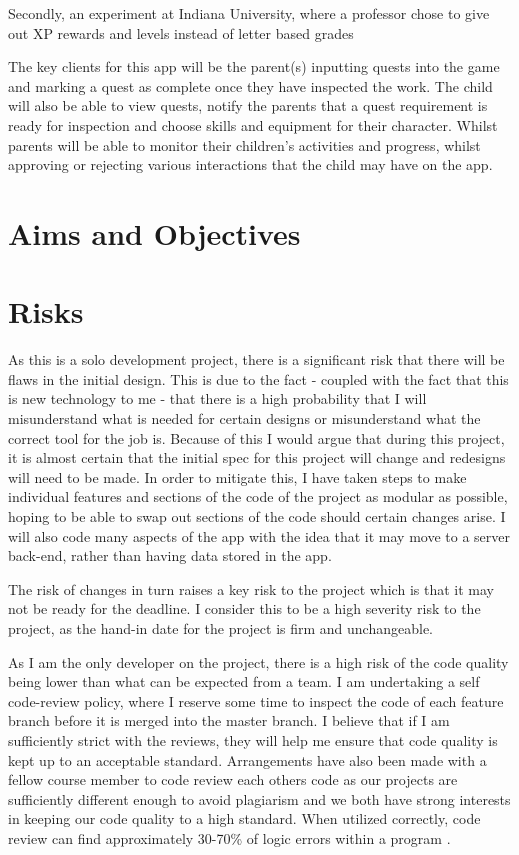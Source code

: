 Secondly, an experiment at Indiana University, where a professor chose to give out XP rewards and levels instead of letter based grades \cite{sheldon2011multiplayer} 

The key clients for this app will be the parent(s) inputting quests into the game and marking a quest as complete once they have inspected the work. 
The child will also be able to view quests, notify the parents that a quest requirement is ready for inspection and choose skills and equipment for their character. 
Whilst parents will be able to monitor their children's activities and progress, whilst approving or rejecting various interactions that the child may have on the app.

\section{Aims and Objectives}


\section{Risks}
As this is a solo development project, there is a significant risk that there will be flaws in the initial design. 
This is due to the fact - coupled with the fact that this is new technology to me - that there is a high probability that I will misunderstand what is needed for certain designs or misunderstand what the correct tool for the job is.
Because of this I would argue that during this project, it is almost certain that the initial spec for this project will change and redesigns will need to be made. 
In order to mitigate this, I have taken steps to make individual features and sections of the code of the project as modular as possible, hoping to be able to swap out sections of the code should certain changes arise.
I will also code many aspects of the app with the idea that it may move to a server back-end, rather than having data stored in the app. 
 
The risk of changes in turn raises a key risk to the project which is that it may not be ready for the deadline. 
I consider this to be a high severity risk to the project, as the hand-in date for the project is firm and unchangeable. 

As I am the only developer on the project, there is a high risk of the code quality being lower than what can be expected from a team.
I am undertaking a self code-review policy, where I reserve some time to inspect the code of each feature branch before it is merged into the master branch.
I believe that if I am sufficiently strict with the reviews, they will help me ensure that code quality is kept up to an acceptable standard.
Arrangements have also been made with a fellow course member to code review each others code as our projects are sufficiently different enough to avoid plagiarism and we both have strong interests in keeping our code quality to a high standard.
When utilized correctly, code review can find approximately 30-70\% of logic errors within a program \citep{myers2011art}.

